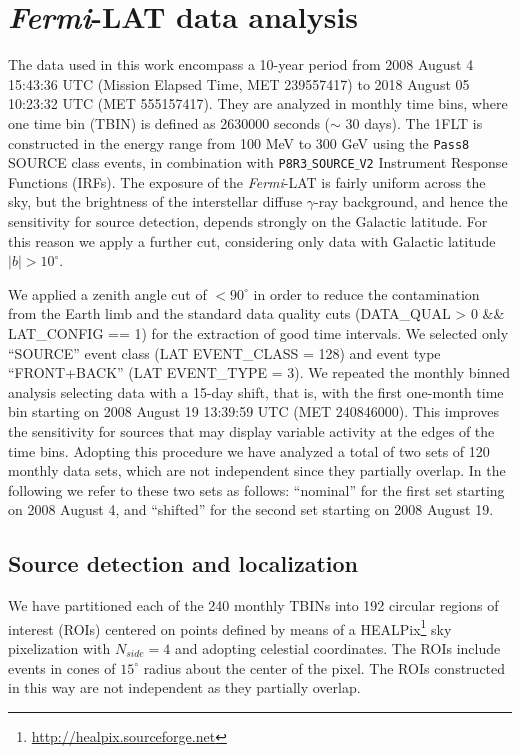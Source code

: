 \documentclass{aastex62}
\newcommand\fermilat{{\it Fermi}-LAT }
\begin{document}
 
\section{\fermilat data analysis}\label{sec:analysis}

The data used in this work encompass a 10-year period from 2008 August 4 15:43:36 UTC (Mission Elapsed Time, MET 239557417) to 2018 August 05 10:23:32 UTC (MET 555157417). They are analyzed in monthly time bins, where one time bin (TBIN) is defined as 2630000 seconds ($\sim$ 30 days).
The 1FLT is constructed in the energy range from 100 MeV to 300 GeV using the \texttt{Pass8} SOURCE class events, in combination with  \texttt{P8R3$\_$SOURCE$\_$V2} Instrument Response Functions (IRFs).  
%
The exposure of the \fermilat is fairly uniform across the sky, but the brightness of the interstellar diffuse $\gamma$-ray background, and hence the sensitivity for source detection,  depends strongly on the Galactic latitude. For this reason we apply a further cut, considering only data with Galactic latitude $|b|>10^\circ$.

We applied a zenith angle cut of $<90^\circ$ in order to reduce the contamination from the Earth limb  and the standard data quality cuts (DATA\_QUAL > 0 \&\& LAT\_CONFIG == 1) for the extraction of good time intervals. We selected only ``SOURCE'' event class (LAT EVENT\_CLASS = 128) and event type ``FRONT+BACK'' (LAT EVENT\_TYPE = 3).
We repeated the monthly binned analysis selecting data with a 15-day shift, that is, with the first one-month time bin starting on 2008 August 19 13:39:59 UTC (MET 240846000). 
This improves the sensitivity for sources that may display variable activity at the edges of the time bins.
Adopting this procedure we have analyzed  a total of two sets of 120 monthly data sets, which are not independent since they partially overlap. In the following we refer to these two sets as follows: ``nominal'' for the first set starting on 2008 August 4, and ``shifted'' for the second set starting on 2008 August 19.

\subsection{Source detection and localization}\label{subsec:souSel}
We have partitioned each of the 240 monthly TBINs into 192 circular regions of interest (ROIs) centered on points defined by means of a HEALPix\footnote{\url{http://healpix.sourceforge.net}} sky pixelization \citep{gorski2005healpix} with $N_{side} = 4$ and adopting celestial coordinates. The ROIs include events in cones of $15^\circ$ radius about the center of the pixel. The ROIs constructed in this way are not independent as they partially overlap. 
\end{document}
